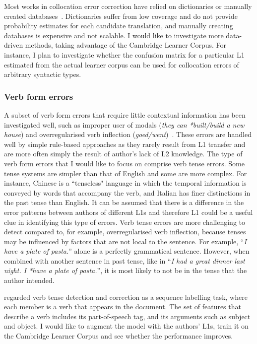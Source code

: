 \documentclass[11pt]{article}
\begin{document}
Most works in collocation error correction have relied on dictionaries or 
manually created databases~\citep{shei2000esl, wible2003bootstrapping, 
futagi2008computational}. Dictionaries suffer from low coverage and do not 
provide probability estimates for each candidate translation, and manually 
creating databases is expensive and not scalable. I would like to investigate 
more data-driven methods, taking advantage of the Cambridge Learner Corpus. For 
instance, I plan to investigate whether the confusion matrix for a particular L1 
estimated from the actual learner corpus can be used for collocation errors of 
arbitrary syntactic types.


\subsubsection{Verb form errors}
\label{subsub:verb}
A subset of verb form errors that require little contextual information has been 
investigated well, such as improper user of modals (\emph{they can *built/build 
a new house}) and overregularised verb inflection 
({\em *goed/went})~\citep{chodorow2000unsupervised, leacock2003automated}. These 
errors are handled well by simple rule-based approaches as they rarely 
result from L1 transfer and are more often simply the result of author's lack of L2 knowledge. The type of verb 
form errors that I would like to focus on comprise verb tense errors. Some tense 
systems are simpler than that of English and some are more complex. For 
instance, Chinese is a ``tenseless" language in which the temporal information is 
conveyed by words that accompany the verb, and Italian has finer distinctions in 
the past tense than English. It can be assumed that there is a difference in the 
error patterns between authors of different L1s and therefore L1 could be a useful 
clue in identifying this type of errors. Verb tense errors are more challenging 
to detect compared to, for example, overregularised verb inflection, because 
tenses may be influenced by factors that are not local to the sentence. For 
example, ``{\em I have a plate of pasta.}'' alone is a perfectly grammatical sentence. 
However, when combined with another sentence in past tense, like in ``{\em I had a 
great dinner last night. I *have a plate of pasta.}'', it is most likely to not be in 
the tense that the author intended.

\cite{tajiri2012tense} regarded verb tense detection and correction as a 
sequence labelling task, where each member is a verb that appears in the 
document. The set of features that describe a verb includes its 
part-of-speech tag, and its arguments such as subject and object. I would like to 
augment the model with the authors' L1s, train it on the Cambridge Learner Corpus 
and see whether the performance improves.
\end{document}
